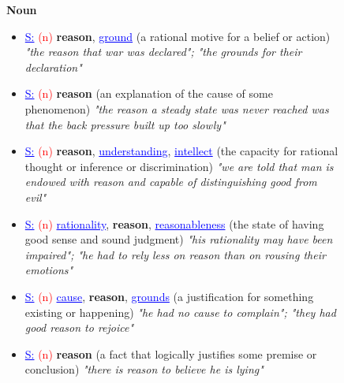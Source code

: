 \documentclass{KBook}
\begin{document}
\begin{figure}[ht]
	\centering
	\begin{tcolorbox}[colback=white, colframe=blue, boxrule=1pt, text width=.90\textwidth]
		\fontsize{11}{8}\selectfont
			{\normalsize\bfseries Noun}
			\begin{itemize}[label=$\bullet$]
				\item \textcolor{blue}{\underline{S:}} \textcolor{red}{(n)} \textbf{reason}, \textcolor{blue}{\underline{ground}} (a rational motive for a belief or action) \textit{"the reason that war was declared"; "the grounds for their declaration"}
				\item \textcolor{blue}{\underline{S:}} \textcolor{red}{(n)} \textbf{reason} (an explanation of the cause of some phenomenon) \textit{"the reason a steady state was never reached was that the back pressure built up too slowly"}
				\item \textcolor{blue}{\underline{S:}} \textcolor{red}{(n)} \textbf{reason}, \textcolor{blue}{\underline{understanding}}, \textcolor{blue}{\underline{intellect}} (the capacity for rational thought or inference or discrimination) \textit{"we are told that man is endowed with reason and capable of distinguishing good from evil"}
				\item \textcolor{blue}{\underline{S:}} \textcolor{red}{(n)} \textcolor{blue}{\underline{rationality}}, \textbf{reason}, \textcolor{blue}{\underline{reasonableness}} (the state of having good sense and sound judgment) \textit{"his rationality may have been impaired"; "he had to rely less on reason than on rousing their emotions"}
				\item \textcolor{blue}{\underline{S:}} \textcolor{red}{(n)} \textcolor{blue}{\underline{cause}}, \textbf{reason}, \textcolor{blue}{\underline{grounds}} (a justification for something existing or happening) \textit{"he had no cause to complain"; "they had good reason to rejoice"}
				\item \textcolor{blue}{\underline{S:}} \textcolor{red}{(n)} \textbf{reason} (a fact that logically justifies some premise or conclusion) \textit{"there is reason to believe he is lying"}
			\end{itemize}
			

\end{tcolorbox}
\end{figure}
\end{document}
